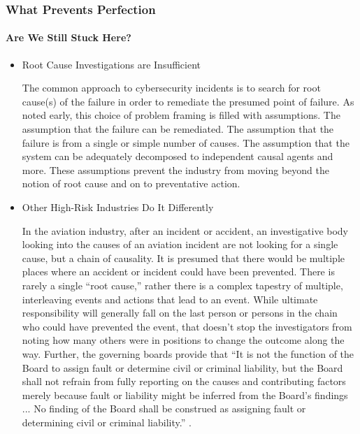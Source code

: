 \begin{frame}
  \frametitle{What Prevents Perfection}
  \framesubtitle{Are We Still Stuck Here?}
  \begin{itemize}
    \item<1-> Root Cause Investigations are Insufficient

           {\scriptsize{The common approach to cybersecurity incidents is to search for root cause(s) of the failure in order to remediate the presumed point of failure. As noted early, this choice of problem framing is filled with assumptions. The assumption that the failure can be remediated. The assumption that the failure is from a single or simple number of causes. The assumption that the system can be adequately decomposed to independent causal agents and more. These assumptions prevent the industry from moving beyond the notion of root cause and on to preventative action.}}

    \item<2-> Other High-Risk Industries Do It Differently

           {\scriptsize{In the aviation industry, after an incident or accident, an investigative body looking into the causes of an aviation incident are not looking for a single cause, but a chain of causality. It is presumed that there would be multiple places where an accident or incident could have been prevented. There is rarely a single ``root cause,'' rather there is a complex tapestry of multiple, interleaving events and actions that lead to an event. While ultimate responsibility will generally fall on the last person or persons in the chain who could have prevented the event, that doesn't stop the investigators from noting how many others were in positions to change the outcome along the way. Further, the governing boards provide that  ``It is not the function of the Board to assign fault or determine civil or criminal liability, but the Board shall not refrain from fully reporting on the causes and contributing factors merely because fault or liability might be inferred from the Board's findings ... No finding of the Board shall be construed as assigning fault or determining civil or criminal liability.'' \parencite{dempseyIndependenceAviationSafety2010}. }}

  \end{itemize}
\end{frame}
